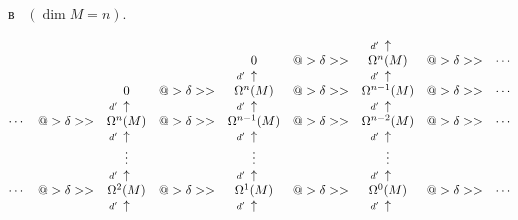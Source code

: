 в~\cite{Br} $(\dim M=n)$.


\begin{equation}


\label{comp_br}


\begin{matrix}


\ & \ & \ & \ & \ & \ & \UP & \ & \ \\


%


\ & \ & \ & \ & 0 & @> {\delta}>> & \Omega^{n}(M) &


@> {\delta}>> & \dotsb \\


%


\ & \ & \ & \ & \UP & \ & \UP & \ & \ \\


%


\ & \ & 0 & @>{\delta}>> & \Omega^{n}(M) &  @>{\delta}>> &


\Omega^{n-1}(M) &  @>{\delta}>> & \dotsb \\


%


\ & \ & \UP & \ & \UP & & \UP & & \\


%


\dotsb & @>{\delta}>> & \Omega^{n}(M) & @>{\delta}>> &


\Omega^{n-1}(M) &  @>{\delta}>> & \Omega^{n-2}(M) &


@>{\delta}>> & \dotsb\\


%


\ & \ & \UP  & \ & \UP & \ & \UP & & \\


%


& & \vdots & & \vdots & & \vdots & & \\


%


& & \UP & & \UP  & & \UP & & \\


%


\dotsb & @>{\delta}>> & \Omega^{2}(M) &  @>{\delta}>> &


\Omega^{1}(M) & @>{\delta}>> & \Omega^{0}(M) &


@>{\delta}>> & \dotsb\\


%


& & \UP  & & \UP  & & \UP & & \\



\end{matrix}
\end{equation}
